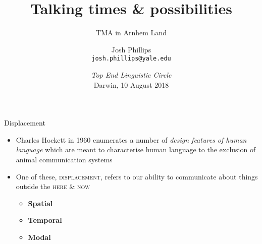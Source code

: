 \documentclass[11pt,usenames,dvipsnames]{beamer}%
\title[]{Talking times \& possibilities}
\subtitle{TMA in Arnhem Land}
\author{Josh Phillips\\{\scriptsize \texttt{josh.phillips@yale.edu}}}
\institute{Yale Linguistics}
\date[TELC Aug 2018]{\footnotesize{\textcolor{ochre}{\textit{Top End Linguistic Circle}\\\scriptsize Darwin, 10 August 2018}}}
\begin{document}
  	\frame[noframenumbering]{\titlepage}
  	\begin{frame}{Displacement}
  		\begin{itemize}
  			\item Charles Hockett in 1960 enumerates a number of \textit{design features of human language} which are meant to characterise human language to the exclusion of animal communication systems
  			\item One of these, \textsc{displacement}, refers to our ability to communicate about things outside the \textsc{here \& now}
  		\begin{itemize}
  			\item \textbf{Spatial }
  			\item \textbf{Temporal }
 			\item \textbf{Modal }
  		\end{itemize}  			
  		\end{itemize}
  	\end{frame}
 	
 
\end{document}
